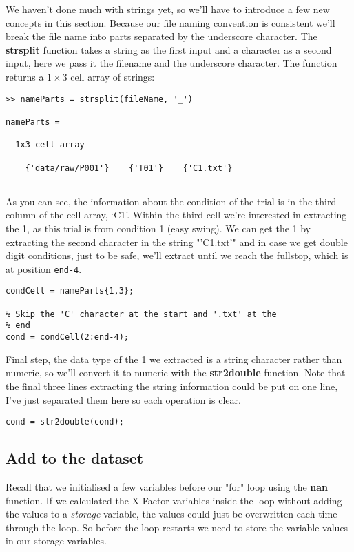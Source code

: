 \documentclass[12pt,a4paper]{article}
\begin{document}
We haven't done much with strings yet, so we'll have to introduce a few new concepts in this section.
Because our file naming convention is consistent we'll break the file name into parts separated by the underscore character.
The \textbf{strsplit} function takes a string as the first input and a character as a second input, here we pass it the filename and the underscore character.
The function returns a $1 \times 3$ cell array of strings:

\begin{lstlisting}[style=Matlab-editor]
>> nameParts = strsplit(fileName, '_')

nameParts =

  1x3 cell array

    {'data/raw/P001'}    {'T01'}    {'C1.txt'}
    
\end{lstlisting}

As you can see, the information about the condition of the trial is in the third column of the cell array, `C1'.
Within the third cell we're interested in extracting the 1, as this trial is from condition 1 (easy swing).
We can get the 1 by extracting the second character in the string "'C1.txt'" and in case we get double digit conditions, just to be safe, we'll extract until we reach the fullstop, which is at position \texttt{end-4}.

\begin{lstlisting}[style=Matlab-editor]
% Extract the third cell
condCell = nameParts{1,3};
    
% Skip the 'C' character at the start and '.txt' at the 
% end
cond = condCell(2:end-4);
\end{lstlisting}

Final step, the data type of the 1 we extracted is a string character rather than numeric, so we'll convert it to numeric with the \textbf{str2double} function.
Note that the final three lines extracting the string information could be put on one line, I've just separated them here so each operation is clear.

\begin{lstlisting}[style=Matlab-editor]
% Convert the character to numeric
cond = str2double(cond);
\end{lstlisting}

\subsection{Add to the dataset}
Recall that we initialised a few variables before our "for" loop using the \textbf{nan} function.
If we calculated the X-Factor variables inside the loop without adding the values to a \emph{storage} variable, the values could just be overwritten each time through the loop.
So before the loop restarts we need to store the variable values in our storage variables.
\end{document}
